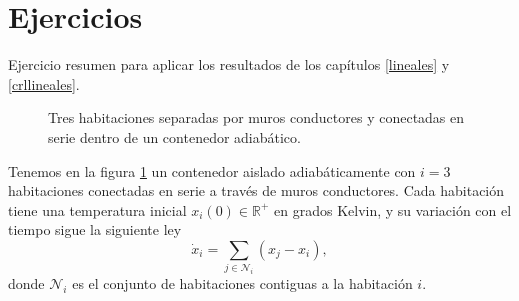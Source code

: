 \section*{Ejercicios}
Ejercicio resumen para aplicar los resultados de los capítulos \ref{lineales} y \ref{crllineales}.\label{ejercicios}

\begin{figure}[h]
\centering
{}
	\caption{Tres habitaciones separadas por muros conductores y conectadas en serie dentro de un contenedor adiabático.}
	\label{fig: adiabatico}
\end{figure}

Tenemos en la figura \ref{fig: adiabatico} un contenedor aislado adiabáticamente con $i=3$ habitaciones conectadas en serie a través de muros conductores. Cada habitación tiene una temperatura inicial $x_i(0)\in\mathbb{R}^+$ en grados Kelvin, y su variación con el tiempo sigue la siguiente ley
\begin{equation}
	\dot x_i = \sum_{j\in\mathcal{N}_i}(x_j - x_i), \label{eq: temp}
\end{equation}
donde $\mathcal{N}_i$ es el conjunto de habitaciones contiguas a la habitación $i$.

